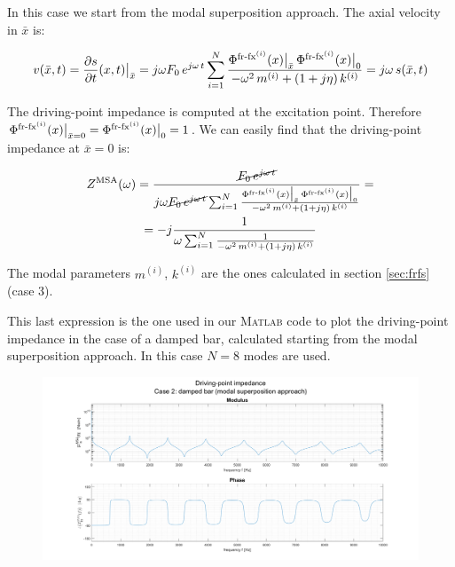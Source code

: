 \documentclass[a4paper,12pt,oneside]{article}
\begin{document}
In this case we start from the modal superposition approach. The axial velocity in $ \bar{x} $ is:

\[
	v(\bar{x},t) = \frac{\partial s}{\partial t}(x,t)\big|_{\bar{x}} =
		j \omega F_0 \, e^{j \omega \, t}
		\sum_{i=1}^N \frac{\Phi^{\textup{fr-fx}^{(i)}}(x)\big|_{\bar{x}} \,
		\Phi^{\textup{fr-fx}^{(i)}}(x)\big|_0}
		{-\omega^2 \, m^{(i)} + (1 + j \eta) \, k^{(i)}} = j \omega \, s(\bar{x},t)
\]

The driving-point impedance is computed at the excitation point. Therefore $ \Phi^{\textup{fr-fx}^{(i)}}(x)\big|_{\bar{x} = 0} = \Phi^{\textup{fr-fx}^{(i)}}(x)\big|_0 = 1 $. We can easily find that the driving-point impedance at $ \bar{x} = 0 $ is:

\begin{gather*}
	Z^\textup{MSA}(\omega) = \frac{\cancel{F_0 \, e^{j \omega \, t}}}
		{j \omega \cancel{F_0 \, e^{j \omega \, t}}
		\sum_{i=1}^N \frac{\Phi^{\textup{fr-fx}^{(i)}}(x)\big|_{\bar{x}} \,
		\Phi^{\textup{fr-fx}^{(i)}}(x)\big|_0}
		{-\omega^2 \, m^{(i)} + (1 + j \eta) \, k^{(i)}}}	= \\
	= -j \frac{1}{\omega \sum_{i=1}^N
		\frac{1}{-\omega^2 \, m^{(i)} + (1 + j \eta) \, k^{(i)}}}
\end{gather*} 

The modal parameters $ m^{(i)} $, $ k^{(i)} $ are the ones calculated in section \ref{sec:frfs} (case 3).

This last expression is the one used in our \textsc{Matlab} code to plot the driving-point impedance in the case of a damped bar, calculated starting from the modal superposition approach. In this case $ N = 8 $ modes are used.

\begin{figure}[h]
	\hspace{-70pt}
	\includegraphics[scale=0.4]{impedance_modal_superposition_approach}
\end{figure}
\end{document}
